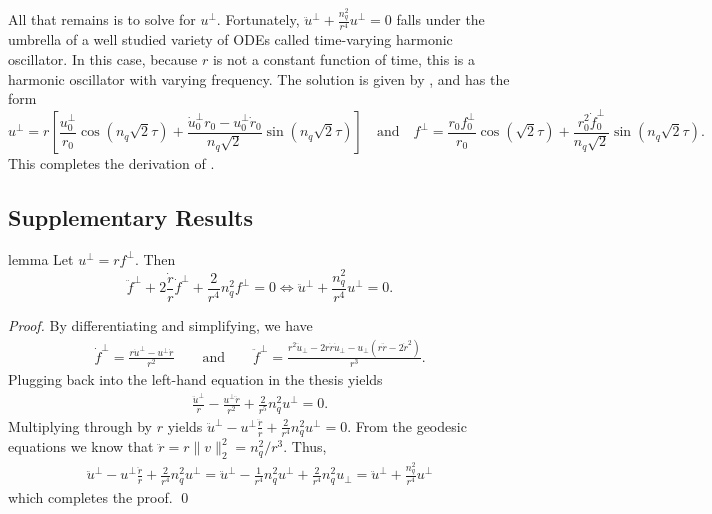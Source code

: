 \documentclass[11pt]{article}
\begin{document}
All that remains is to solve for $u^\perp$. Fortunately, $\ddot u^{\perp} + \frac{n_q^2}{r^4}u^\perp = 0$ falls under the umbrella of a well studied variety of ODEs called time-varying harmonic oscillator. In this case, because $r$ is not a constant function of time, this is a harmonic oscillator with varying frequency. The solution is given by , and has the form
\begin{equation*}
    u^{\perp} = r\left[\frac{u^{\perp}_0}{r_0}\cos(n_q\sqrt{2}\tau) + \frac{\dot u_{0}^\perp r_0 - u_{0}^\perp \dot r_0}{n_q\sqrt{2}}\sin(n_q\sqrt{2}\tau)\right] \quad \text{and} \quad f^{\perp} = \frac{r_0f_{0}^\perp}{r_0}\cos(\sqrt{2}\tau) + \frac{r_0^2\dot f_{0}^\perp}{n_q\sqrt{2}}\sin(n_q\sqrt{2}\tau).
\end{equation*}
This completes the derivation of . 


\subsection{Supplementary Results}

\begin{restatable}{lemma}{} \label{lemma: orthog jacobi equation}
    Let $u^\perp = rf^\perp$. Then
    \begin{equation*}
        \ddot f^{\perp} +  2\frac{\dot r}{r}\dot f^{\perp} + \frac{2}{r^4}n_q^2f^{\perp} = 0 \iff \ddot u^{\perp} + \frac{n_q^2}{r^4}u^\perp = 0.
    \end{equation*}
\end{restatable}
\noindent \textit{Proof.} By differentiating and simplifying, we have
\begin{align*}
    \dot f^{\perp} = \frac{r\dot u^{\perp} - u^\perp \dot r}{r^2} \qquad \text{and} \qquad \ddot f^\perp = \frac{r^2 \ddot u_{\perp} - 2r\dot r\dot u_{\perp}- u_\perp\left(r \ddot r - 2 \dot r^2\right)}{r^3}.
\end{align*}
Plugging back into the left-hand equation in the thesis yields
\begin{align*}
    \frac{\ddot u^{\perp}}{r} - \frac{u^\perp \ddot r}{r^2} + \frac{2}{r^5}n_q^2u^{\perp} = 0.
\end{align*}
Multiplying through by $r$ yields $\ddot u^{\perp} - u^\perp \frac{\ddot r}{r} + \frac{2}{r^4}n_q^2u^{\perp} = 0$. From the geodesic equations we know that $\ddot r = r\|v\|_2^2 = n_q^2/r^3$. Thus,
\begin{align*}
    \ddot u^{\perp} - u^\perp \frac{\ddot r}{r} + \frac{2}{r^4}n_q^2u^{\perp} = \ddot u^{\perp} -  \frac{1}{r^4}n_q^2u^\perp + \frac{2}{r^4}n_q^2u_{\perp} = \ddot u^{\perp} + \frac{n_q^2}{r^4}u^\perp
\end{align*}
which completes the proof. \qed{}
\end{document}

